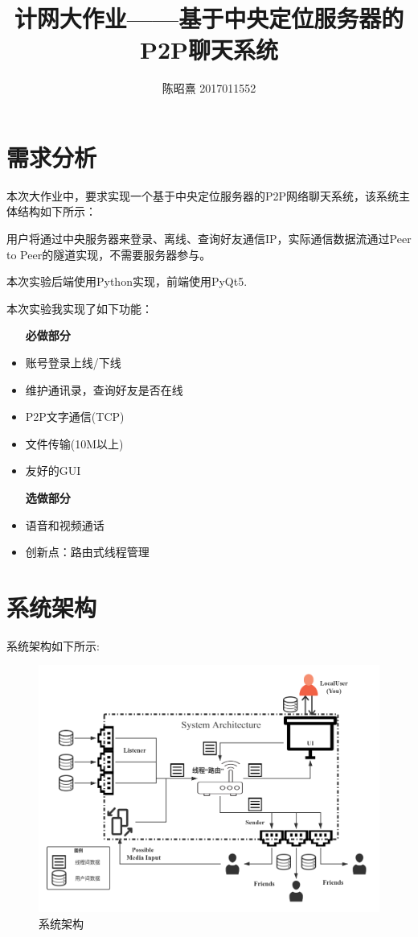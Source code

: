 \documentclass[UTF8]{ctexart}
\begin{document}
\title{计网大作业——基于中央定位服务器的P2P聊天系统}
\author{陈昭熹 2017011552}
\maketitle
\tableofcontents
\newpage

\section{需求分析}
本次大作业中，要求实现一个基于中央定位服务器的P2P网络聊天系统，该系统主体结构如下所示：

用户将通过中央服务器来登录、离线、查询好友通信IP，实际通信数据流通过Peer to Peer的隧道实现，不需要服务器参与。

本次实验后端使用Python实现，前端使用PyQt5.

本次实验我实现了如下功能：
\begin{itemize}
    \item[\textbf{必做部分}] 
    \item 账号登录上线/下线
    \item 维护通讯录，查询好友是否在线
    \item P2P文字通信(TCP)
    \item 文件传输(10M以上)
    \item 友好的GUI
    \item[\textbf{选做部分}]
    \item 语音和视频通话
    \item 创新点：路由式线程管理 
\end{itemize}

\section{系统架构}\label{arch}
系统架构如下所示:
\begin{figure}[H]
    \centering
    \includegraphics[scale=0.33]{myqq.png}
    \caption{系统架构}
\end{figure}
\end{document}
